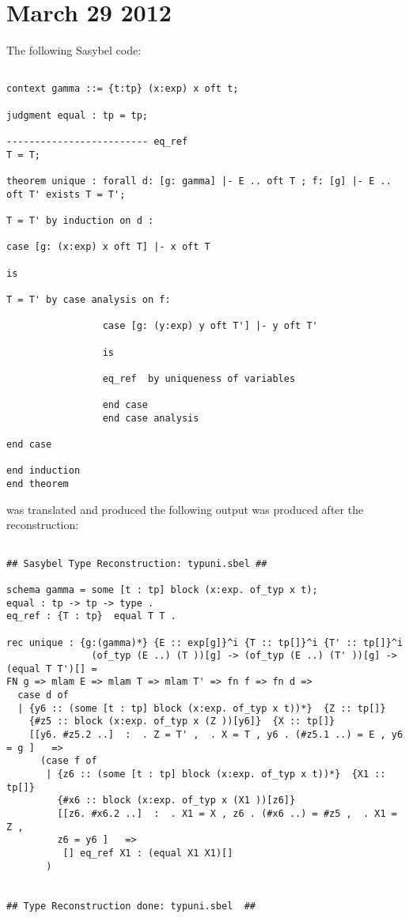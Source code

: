 \documentclass[12pt]{article}
\begin{document}
\section{March 29 2012}
The following \textmd{Sasybel} code:
\footnotesize\begin{verbatim}

context gamma ::= {t:tp} (x:exp) x oft t;

judgment equal : tp = tp;

------------------------- eq_ref
T = T;

theorem unique : forall d: [g: gamma] |- E .. oft T ; f: [g] |- E .. oft T' exists T = T';

T = T' by induction on d :

case [g: (x:exp) x oft T] |- x oft T

is

T = T' by case analysis on f:

                 case [g: (y:exp) y oft T'] |- y oft T'

                 is

                 eq_ref  by uniqueness of variables

                 end case
                 end case analysis

end case

end induction
end theorem

\end{verbatim}
was translated and produced the following output was produced after the reconstruction:
\footnotesize\begin{verbatim}

## Sasybel Type Reconstruction: typuni.sbel ##

schema gamma = some [t : tp] block (x:exp. of_typ x t);
equal : tp -> tp -> type .
eq_ref : {T : tp}  equal T T .

rec unique : {g:(gamma)*} {E :: exp[g]}^i {T :: tp[]}^i {T' :: tp[]}^i
               (of_typ (E ..) (T ))[g] -> (of_typ (E ..) (T' ))[g] -> (equal T T')[] =
FN g => mlam E => mlam T => mlam T' => fn f => fn d =>
  case d of
  | {y6 :: (some [t : tp] block (x:exp. of_typ x t))*}  {Z :: tp[]}
    {#z5 :: block (x:exp. of_typ x (Z ))[y6]}  {X :: tp[]}
    [[y6. #z5.2 ..]  :  . Z = T' ,  . X = T , y6 . (#z5.1 ..) = E , y6 = g ]   =>
      (case f of
       | {z6 :: (some [t : tp] block (x:exp. of_typ x t))*}  {X1 :: tp[]}
         {#x6 :: block (x:exp. of_typ x (X1 ))[z6]}
         [[z6. #x6.2 ..]  :  . X1 = X , z6 . (#x6 ..) = #z5 ,  . X1 = Z ,
         z6 = y6 ]   =>
          [] eq_ref X1 : (equal X1 X1)[]
       )


## Type Reconstruction done: typuni.sbel  ##

\end{verbatim}
\end{document}
